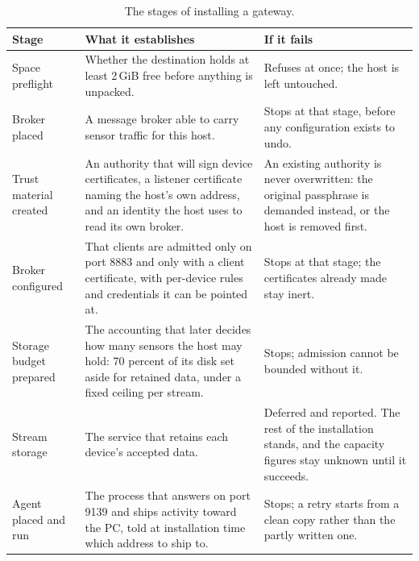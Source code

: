 \documentclass[12pt,a4paper]{report}
\begin{document}
\begin{table}[H]
\centering
{\small
\begin{tabularx}{\textwidth}{@{}p{3.1cm}Yp{3.9cm}@{}}
\toprule
\textbf{Stage} & \textbf{What it establishes} & \textbf{If it fails} \\
\midrule
Space preflight &
Whether the destination holds at least 2\,GiB free before anything is
unpacked. &
Refuses at once; the host is left untouched. \\
\midrule
Broker placed &
A message broker able to carry sensor traffic for this host. &
Stops at that stage, before any configuration exists to undo. \\
\midrule
Trust material created &
An authority that will sign device certificates, a listener
certificate naming the host's own address, and an identity the host
uses to read its own broker. &
An existing authority is never overwritten: the original passphrase is
demanded instead, or the host is removed first. \\
\midrule
Broker configured &
That clients are admitted only on port 8883 and only with a client
certificate, with per-device rules and credentials it can be pointed
at. &
Stops at that stage; the certificates already made stay inert. \\
\midrule
Storage budget prepared &
The accounting that later decides how many sensors the host may hold:
70 percent of its disk set aside for retained data, under a fixed
ceiling per stream. &
Stops; admission cannot be bounded without it. \\
\midrule
Stream storage &
The service that retains each device's accepted data. &
Deferred and reported. The rest of the installation stands, and the
capacity figures stay unknown until it succeeds. \\
\midrule
Agent placed and run &
The process that answers on port 9139 and ships activity toward the PC,
told at installation time which address to ship to. &
Stops; a retry starts from a clean copy rather than the partly written
one. \\
\bottomrule
\end{tabularx}}
\caption{The stages of installing a gateway.}
\label{tab:mon-install}
\end{table}
\end{document}
